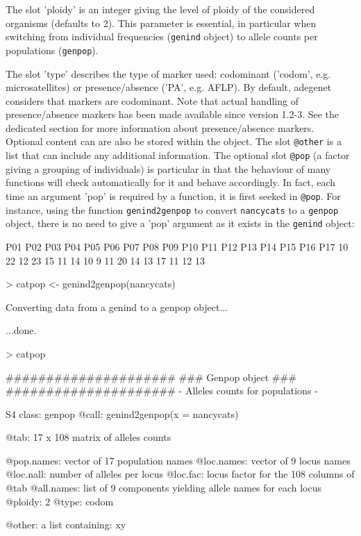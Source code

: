 \documentclass{article}
\begin{document}
\noindent The slot 'ploidy' is an integer giving the level of ploidy
of the considered organisms (defaults to 2).
This parameter is essential, in particular when switching from
individual frequencies (\texttt{genind} object) to allele counts per
populations (\texttt{genpop}).

\noindent
The slot 'type' describes the type of marker used: codominant ('codom', e.g. microsatellites) or presence/absence ('PA', e.g. AFLP).
By default, adegenet considers that markers are codominant.
Note that actual handling of presence/absence markers has been made available since version 1.2-3.
See the dedicated section for more information about presence/absence markers.
\\


Optional content can are also be stored within the object.
The slot \texttt{@other} is a list that can include any additional information.
The optional slot \texttt{@pop} (a factor giving a grouping of individuals) is particular in that the behaviour of many functions will check automatically for it and behave accordingly.
In fact, each time an argument 'pop' is required by a function, it is first seeked in \texttt{@pop}.
For instance, using the function \texttt{genind2genpop} to convert \texttt{nancycats} to a \texttt{genpop} object, there is no need to give a 'pop' argument as it exists in the \texttt{genind} object:
\begin{Schunk}
\begin{Soutput}
P01 P02 P03 P04 P05 P06 P07 P08 P09 P10 P11 P12 P13 P14 P15 P16 P17 
 10  22  12  23  15  11  14  10   9  11  20  14  13  17  11  12  13 
\end{Soutput}
\begin{Sinput}
> catpop <- genind2genpop(nancycats)
\end{Sinput}
\begin{Soutput}
 Converting data from a genind to a genpop object... 

...done.
\end{Soutput}
\begin{Sinput}
> catpop
\end{Sinput}
\begin{Soutput}
       #####################
       ### Genpop object ### 
       #####################
- Alleles counts for populations - 

S4 class:  genpop
@call: genind2genpop(x = nancycats)

@tab:  17 x 108 matrix of alleles counts

@pop.names: vector of  17 population names
@loc.names: vector of  9 locus names
@loc.nall: number of alleles per locus
@loc.fac: locus factor for the  108 columns of @tab
@all.names: list of  9 components yielding allele names for each locus
@ploidy:  2
@type:  codom

@other: a list containing: xy 
\end{Soutput}
\end{Schunk}
\end{document}
